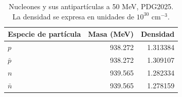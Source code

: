 \begin{table}[t]\centering\small
\caption{Nucleones y sus antipartículas a 50 MeV, PDG2025. La densidad se expresa en unidades de $10^{30}$ cm$^{-3}$.}
\label{tab:nucleons50}
\begin{tabular}{lrr}\toprule
Especie de partícula & Masa (MeV) & Densidad\\\midrule
$p$ & 938.272 & 1.313384\\
$\bar p$ & 938.272 & 1.309107\\
$n$ & 939.565 & 1.282334\\
$\bar n$ & 939.565 & 1.278159\\
\bottomrule\end{tabular}
\end{table}
